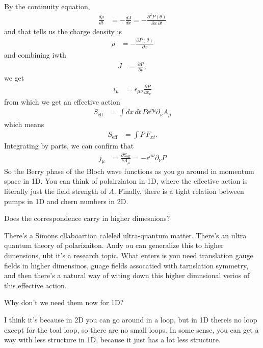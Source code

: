 By the continuity equation,
\begin{align}
    \frac{d\rho}{dt} &=
    -\frac{dJ}{dx}
    =
    -\frac{\partial^2 P(\theta)}{\partial x\, \partial t}
\end{align}
and that tells us the charge density is
\begin{align}
    \rho &=
    - \frac{\partial P(\theta)}{\partial x}
\end{align}
and combining iwth
\begin{align}
    J &= \frac{\partial P}{\partial t},
\end{align}
we get
\begin{align}
    i_{\mu} &=
    \epsilon_{\mu\nu} \frac{\partial P}{\partial x_\nu}
\end{align}
from which we get an effective action
\begin{align}
    S_{\text{eff}} &=
    \int dx\, dt\,
    P e^{\nu \mu} \partial_\nu A_\mu
\end{align}
which means
\begin{align}
    S_{\text{eff}} &=
    \int P\, F_{xt}.
\end{align}
Integrating by parts,
we can confirm that
\begin{align}
    j_{\mu} &=
    \frac{\partial S_{\text{eff}}}{\delta A_\mu}
    = -\epsilon^{\mu\nu} \partial_\nu P
\end{align}
So the Berry phase of the Bloch wave functions as you go around in momentum
space in 1D.
You can think of polairziaton in 1D,
where the effective action is literally just the field strength of $A$.
Finally,
there is a tight relation between pumps in 1D and chern numbers in 2D.

\begin{question}
    Does the correspondence carry in higher dimesnions?
\end{question}
There's a Simons cllaboartion caleled ultra-quantum matter.
There's an ultra quantum theory of polarizaiton.
Andy ou can generalize this to higher dimensions,
ubt it's a research topic.
What enters is you need translation gauge fields in higher dimensinos,
guage fields assocatied with tarnslation symmetry,
and then there's a natural way of witing down this higher dimnsional verios of
this effective action.

\begin{question}
    Why don't we need them now for 1D?
\end{question}
I think it's because in 2D you can go around in a loop,
but in 1D thereis no loop except for the toal loop,
so there are no small loops.
In some sense,
you can get a way with less structure in 1D,
because it just has a lot less structure.


